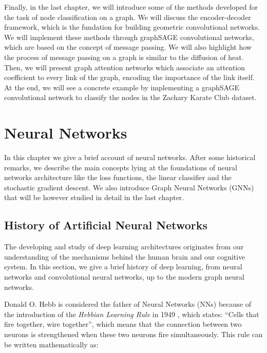\documentclass[12pt,a4paper]{report}
\theoremstyle{definition}
\begin{document}
Finally, in the last chapter, we will introduce some of the methods developed for the task of node classification on a graph.
We will discuss the encoder-decoder framework, which is the fundation for building geometric convolutional networks.
We will implement these methods through graphSAGE convolutional networks, which are based on the concept of message passing.
We will also highlight how the process of message passing on a graph is similar to the diffusion of heat.
Then, we will present graph attention networks which associate an attention coefficient to every link of the graph, encoding the importance of the link itself.
At the end, we will see a concrete example by implementing a graphSAGE convolutional network to classify the nodes in the Zachary Karate Club dataset.




\chapter{Neural Networks}
\label{cap:NN}

In this chapter we give a brief account of neural networks.
After some historical remarks, we describe the main concepts lying at the foundations of neural networks architecture like the loss functions, the linear classifier and the stochastic gradient descent.
We also introduce Graph Neural Networks (GNNs) that will be however studied in detail in the last chapter.



\section{History of Artificial Neural Networks}
\label{sec:history_GNN}

\nocite{GDL_survey}
\nocite{Origin_of_deep_learning}

The developing and study of deep learning architectures originates from our understanding of the mechanisms behind the human brain and our cognitive system.
In this section, we give a brief history of deep learning, from neural networks and convolutional neural networks, up to the modern graph neural networks.

Donald O. Hebb is considered the father of Neural Networks (NNs) because of the introduction of the \emph{Hebbian Learning Rule} in 1949 \cite{Hebbian}, which states: ``Cells that fire together, wire together'', which means that the connection between two neurons is strengthened when these two neurons fire simultaneously. This rule can be written mathematically as:
\end{document}
